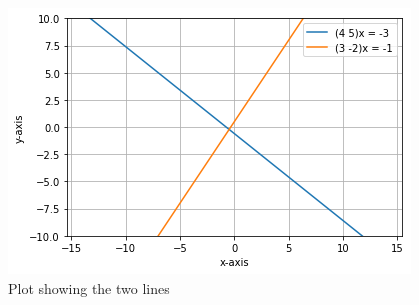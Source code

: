 \documentclass[journal,12pt,twocolumn]{IEEEtran}
\begin{document}
\begin{figure}
\centering
\includegraphics[width=\columnwidth]{Assignment5.png}
\caption{Plot showing the two lines }
\label{Fig 0}
\end{figure}
\end{document}
